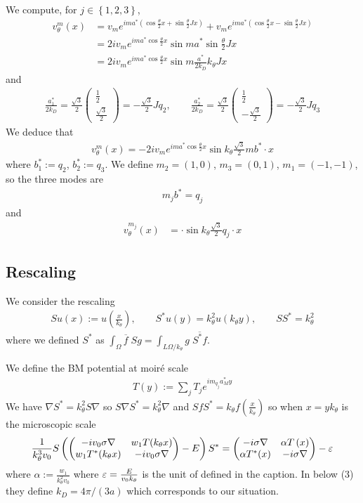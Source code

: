 \documentclass[11pt,a4paper,reqno,french,tikz]{amsart}
\newcommand{\pa}[1]{\left( #1 \right)} %
\newcommand{\acs}[1]{\left\{ #1 \right\}} %
\newcommand{\na}{\nabla} %
\newcommand{\f}[2]{\frac{#1}{#2}} %
\newcommand{\mat}[1]{\begin{pmatrix} #1 \end{pmatrix}} %
\begin{document}
We compute, for $j \in \acs{1,2,3}$,
\begin{align*}
	v^m_\theta(x) &= v_m e^{ima^* \pa{\cos \f{\theta}{2} x + \sin \f{\theta}{2} J x}} +   v_m e^{ima^* \pa{\cos \f{\theta}{2} x - \sin \f{\theta}{2} J x}} \\
		    &= 2i v_m e^{ima^* \cos \f{\theta}{2} x}  \sin ma^* \sin \f{\theta}{2}  Jx \\
		    &=  2i v_m e^{ima^* \cos \f{\theta}{2} x}  \sin m\f{a^*}{2 k_D} k_\theta J x
\end{align*}
and
\begin{align*}
\f{a^*_1}{2 k_D} = \f{\sqrt 3}{2} \mat{ \f{1}{2} \\ \f{\sqrt 3}{2}} = - \f{\sqrt 3}{2} Jq_2, \qquad \f{a^*_2}{2 k_D} = \f{\sqrt 3}{2} \mat{ \f{1}{2} \\ -\f{\sqrt 3}{2}}= - \f{\sqrt 3}{2} Jq_3
\end{align*}
We deduce that
\begin{align*}
	v^m_\theta(x) =  -2i v_m e^{ima^* \cos \f{\theta}{2} x}  \sin k_\theta \f{\sqrt 3}{2} mb^* \cdot x
\end{align*}
where $b^*_1 := q_2$, $b^*_2 := q_3$. We define $m_2=(1,0)$, $m_3=(0,1)$, $m_1 = (-1,-1)$, so the three modes are
\begin{align*}
m_j b^* = q_j
\end{align*}
and
\begin{align*}
	v^{m_j}_\theta(x) &=  \cdot \sin k_\theta \f{\sqrt 3}{2} q_j \cdot x 
\end{align*}



\subsection{Rescaling}%
\label{sub:rescaling}

We consider the rescaling
\begin{align*}
Su(x) := u\pa{\f{x}{k_\theta}}, \qquad S^*u(y) = k_\theta^2 u\pa{k_\theta y}, \qquad S S^* = k_\theta^2
\end{align*}
where we defined $S^*$ as $\int_\Omega \overline{f} \; Sg = \int_{L\Omega/k_\theta} g \; \overline{S^*f}$.

We define the BM potential at moiré scale
\begin{align*}
T(y) := \sum_j T_j e^{im_{q_j} a^*_M y}
\end{align*}
We have $\na S^* = k_\theta^2 S \na$ so $S \na S^* = k_\theta^2 \na$ and $SfS^* = k_\theta f\pa{\f{x}{k_\theta}}$ so when $x = y k_\theta$ is the microscopic scale
\begin{align*}
	\f{1}{k_\theta^3 v_0} S \pa{\mat{-i v_0 \sigma \na & w_1 T(k_\theta x) \\ w_1 T^*(k_\theta x) & -iv_0 \sigma \na} -E} S^* = \mat{-i\sigma \na & \alpha T\pa{x} \\ \alpha T^*(x) & -i\sigma \na} - \ep
\end{align*}
where $\alpha := \f{w_1}{k_\theta^2 v_0}$ where $\ep = \f{E}{v_0 k_\theta}$ is the unit of \cite[Fig 1]{TarKruVis19} defined in the caption. %
In \cite{TarKruVis19} below (3) they define $k_D = 4\pi/(3a)$ which corresponds to our situation.
\end{document}
